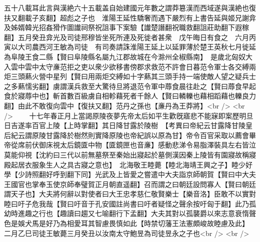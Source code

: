 五十八載耳此言與漢絶六十五載盖自始建國元年數之謂莽簒漢而西域遂與漢絶也復扶又翻載子亥翻】超彪之子也　淮陽王延性驕奢而遇下嚴烈有上書告延與姬兄謝弇及姊婿韓光招姦猾作圖䜟祠祭祝詛事下案驗【䜟楚譖翻祝職救翻詛莊助翻下遐稼翻】五月癸丑弇光及司徒邢穆皆坐死所連及死徙者甚衆　戊午晦日有食之　六月丙寅以大司農西河王敏為司徒　有司奏請誅淮陽王延上以延罪薄於楚王英秋七月徙延為阜陵王食二縣【賢曰阜陵縣名屬九江郡故城在今滁州全椒縣南】　是歲北匈奴大入雲中雲中太守亷范拒之吏以衆少欲移書傍郡求救范不許會日暮范令軍士各交縛兩炬三頭爇火營中星列【賢曰用兩炬交縛如十字爇其三頭手持一端使敵人望之疑兵士之多爇懦劣翻】虜謂漢兵救至大驚待旦將退范令軍中蓐食晨往赴之【賢曰蓐食早起食於寢蓐中也】斬首數百級虜自相軫藉死者千餘人【賢曰轔轢也藉相蹈藉也轢良力翻】由此不敢復向雲中【復扶又翻】范丹之孫也【亷丹為王莽將】<br />
<br />
　　十七年春正月上當謁原陵夜夢先帝太后如平生歡旣寤悲不能寐即案歷明旦日吉遂率百官上陵【上時掌翻】其日降甘露於陵樹　【考異曰帝紀云甘露降甘陵皇后紀云謂原陵甘露降於樹然則實降原陵也帝紀誤以原為甘】帝令百官采取以薦會畢帝從席前伏御床視太后鏡匳中物【匳鏡匣也音亷】感動悲涕令易脂澤裝具左右皆泣莫能仰視【沈約曰三代以前無墓祭至秦始出寢起於墓側漢因秦上陵皆有園寢故稱寢殿起居衣服象生人之具古寢之意也】　北海敬王睦薨【睦北海靖王興之子】睦少好學【少詩照翻好呼到翻下同】光武及上皆愛之嘗遣中大夫詣京師朝賀【賢曰中大夫王國官也掌奉玉使京師奉璧賀正月朝直遥翻】召而謂之曰朝廷設問寡人【賢曰朝廷謂天子也】大夫將何辭以對使者曰大王忠孝慈仁敬賢樂士【樂音洛】臣敢不以實對睦曰吁子危我哉【賢曰吁音于孔安國註尚書曰吁者疑怪之聲余按吁匈于翻】此乃孤幼時進趣之行也【趣讀曰趨又七喻翻行下孟翻】大夫其對以孤襲爵以來志意衰惰聲色是娛犬馬是好乃為相愛耳其智慮畏慎如此【時禁切藩王法憲頗峻故睦慮及此】　二月乙巳司徒王敏薨三月癸丑以汝南太守鮑昱為司徒昱永之子也<br />
<br />
